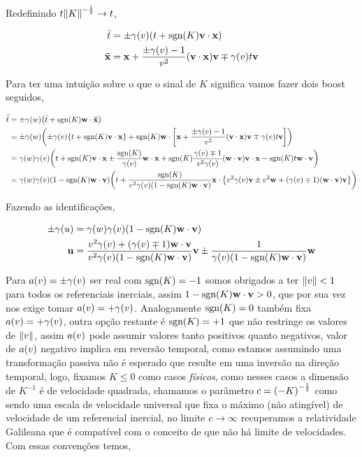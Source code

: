 \documentclass[twoside]{amsart}
\newcommand{\sgn}[1]{\mbox{sgn}\qty(#1)}
\numberwithin{equation}{section}
\begin{document}
Redefinindo $t\norm{K}^{-\frac12}\rightarrow t$,

\begin{align}
    {\bar t}&=\pm\gamma\qty(v)\qty(t+\sgn{K}\vb v \cdot \vb x)\\
    \vb {\bar x}&= \vb x+\frac{\pm\gamma\qty(v)-1}{v^2}\qty(\vb v \cdot \vb x)\vb v\mp\gamma\qty(v)t \vb v
\end{align}

Para ter uma intuição sobre o que o sinal de $K$ significa vamos fazer dois boost seguidos,

\begin{align}
    {\bar{\bar t}}&=\pm\gamma\qty(w)\qty({\bar t}+\sgn{K}\vb w\cdot\vb{\bar x})\\
    &=\pm\gamma\qty(w)\qty(\pm\gamma\qty(v)\qty{t+\sgn{K}\vb v\cdot\vb x}+\sgn{K}\vb w\cdot\qty[\vb x+\frac{\pm\gamma\qty(v)-1}{v^2}\qty(\vb v \cdot \vb x)\vb v\mp\gamma\qty(v)t \vb v])\\
    &=\gamma\qty(w)\gamma\qty(v)\qty(t+\sgn{K}\vb v\cdot\vb x\pm\frac{\sgn K}{\gamma\qty(v)}\vb w\cdot \vb x+\sgn K\frac{\gamma\qty(v)\mp1}{v^2\gamma\qty(v)}\qty(\vb w\cdot \vb v)\vb v\cdot \vb x-\sgn K t\vb w \cdot \vb v)\\
    &=\gamma\qty(w)\gamma\qty(v)\qty(1-\sgn K\vb w\cdot \vb v)\qty(t+\frac{\sgn K}{v^2\gamma\qty(v)\qty(1-\sgn K\vb w\cdot \vb v)} \vb x\cdot \qty{v^2\gamma\qty(v)\vb v\pm v^2\vb w+\qty(\gamma\qty(v)\mp 1)\qty(\vb w\cdot \vb v)\vb v})
\end{align}

Fazendo as identificações,

\begin{align}
    \pm\gamma\qty(u)&=\gamma\qty(w)\gamma\qty(v)\qty(1-\sgn K\vb w\cdot \vb v)\\
    \vb u &=\frac{v^2\gamma\qty(v)+\qty(\gamma\qty(v)\mp1)\vb w\cdot\vb v}{v^2\gamma\qty(v)\qty(1-\sgn K\vb w\cdot\vb v)}\vb v\pm\frac{1}{\gamma\qty(v)\qty(1-\sgn K \vb w\cdot \vb v)}\vb w
\end{align}

Para $a\qty(v)=\pm\gamma\qty(v)$ ser real com $\sgn K=-1$ somos obrigados a ter $\norm{v}< 1$ para todos os referenciais inerciais, assim $1-\sgn K \vb w\cdot \vb v>0$, que por sua vez nos exige tomar $a\qty(v)=+\gamma\qty(v)$. Analogamente $\sgn K=0$ também fixa $a\qty(v)=+\gamma\qty(v)$, outra opção restante é $\sgn K=+1$ que não restringe os valores de $\norm{v}$, assim $a\qty(v)$ pode assumir valores tanto positivos quanto negativos, valor de $a\qty(v)$ negativo implica em reversão temporal, como estamos assumindo uma transformação passiva não é esperado que resulte em uma inversão na direção temporal, logo, fixamos $K\leq 0$ como casos \emph{físicos}, como nesses casos a dimensão de $K^{-1}$ é de velocidade quadrada, chamamos o parâmetro $c=\qty(-K)^{-\frac12}$ como sendo uma escala de velocidade universal que fixa o máximo (não atingível) de velocidade de um referencial inercial, no limite $c\rightarrow \infty$ recuperamos a relatividade Galileana que é compatível com o conceito de que não há limite de velocidades. Com essas convenções temos,
\end{document}
